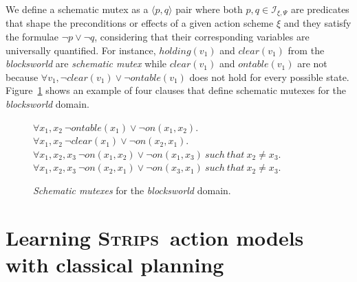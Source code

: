 \documentclass[runningheads]{llncs}
\newcommand{\tup}[1]{{\langle #1 \rangle}}
\newcommand{\strips}{\textsc{Strips}}     %
\begin{document}
We define a schematic mutex as a $\tup{p,q}$ pair where both $p,q\in{\mathcal I}_{\xi,\Psi}$ are predicates that shape the preconditions or effects of a given action scheme $\xi$ and they satisfy the formulae $\neg p\vee \neg q$, considering that their corresponding variables are universally quantified. For instance, $holding(v_1)$ and $clear(v_1)$ from the {\em blocksworld} are {\em schematic mutex} while $clear(v_1)$ and $ontable(v_1)$ are not because $\forall v_1, \neg clear(v_1)\vee\neg ontable(v_1)$ does not hold for every possible state. Figure~\ref{fig:strongest-invariant} shows an example of four clauses that define schematic mutexes for the {\em blocksworld} domain.

\begin{figure}[hbt!]
  \begin{footnotesize}
$\forall x_1,x_2\ \neg ontable(x_1)\vee\neg on(x_1,x_2)$.\\
$\forall x_1,x_2\ \neg clear(x_1)\vee\neg on(x_2,x_1)$.\\
$\forall x_1,x_2,x_3\ \neg on(x_1,x_2)\vee\neg on(x_1,x_3)\ such\ that\ x_2\neq x_3$.\\
$\forall x_1,x_2,x_3\ \neg on(x_2,x_1)\vee\neg on(x_3,x_1)\ such\ that\ x_2\neq x_3$.\\
\end{footnotesize}
 \caption{\small {\em Schematic mutexes} for the {\em blocksworld} domain.}
\label{fig:strongest-invariant}
\end{figure}




\section{Learning \strips\ action models with classical planning}
\end{document}
